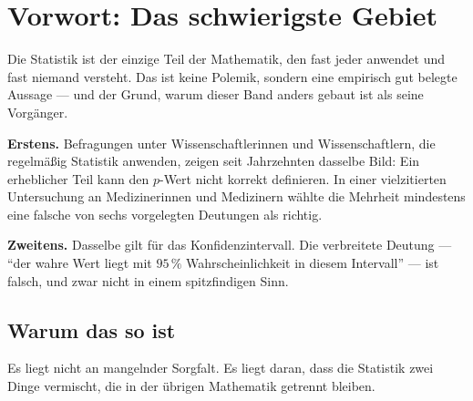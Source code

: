\chapter*{Vorwort: Das schwierigste Gebiet}

Die Statistik ist der einzige Teil der Mathematik, den fast jeder anwendet und fast niemand versteht. Das ist keine Polemik, sondern eine empirisch gut belegte Aussage --- und der Grund, warum dieser Band anders gebaut ist als seine Vorgänger.

\begin{merksatz}
\begin{center}
\begin{minipage}{0.9\textwidth}
\textbf{Erstens.} Befragungen unter Wissenschaftlerinnen und Wissenschaftlern, die regelmäßig Statistik anwenden, zeigen seit Jahrzehnten dasselbe Bild: Ein erheblicher Teil kann den $p$-Wert nicht korrekt definieren. In einer vielzitierten Untersuchung an Medizinerinnen und Medizinern wählte die Mehrheit mindestens eine falsche von sechs vorgelegten Deutungen als richtig.

\textbf{Zweitens.} Dasselbe gilt für das Konfidenzintervall. Die verbreitete Deutung --- \enquote{der wahre Wert liegt mit $95\,\%$ Wahrscheinlichkeit in diesem Intervall} --- ist falsch, und zwar nicht in einem spitzfindigen Sinn.
\end{minipage}
\end{center}

\begin{center}
\begin{minipage}{0.88\textwidth}
\end{minipage}
\end{center}
\end{merksatz}

\section*{Warum das so ist}

Es liegt nicht an mangelnder Sorgfalt. Es liegt daran, dass die Statistik zwei Dinge vermischt, die in der übrigen Mathematik getrennt bleiben.


